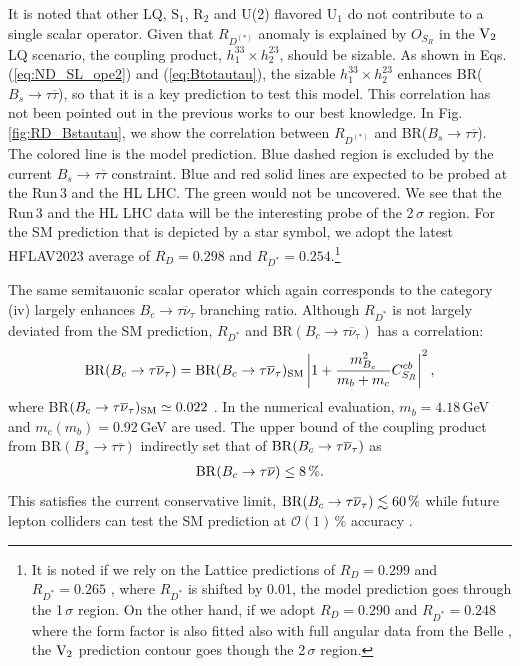 \documentclass[12pt, a4paper]{article}
\numberwithin{equation}{section} %
\newcommand{\ov}{\overline}
\newcommand{\1}{\mbox{1}\hspace{-0.25em}\mbox{l}}
\begin{document}
It is noted that other LQ, $\text{S}_1$, $\text{R}_2$ and U(2) flavored $\text{U}_1$ do not contribute to a single scalar operator.
Given that $R_{D^{(*)}}$ anomaly is explained by $O_{S_R}$ in the $\rm{V}_2$ LQ scenario, the coupling product, $h_1^{33}\times h_2^{23}$, should be sizable. 
As shown in Eqs.\,(\ref{eq:ND_SL_ope2}) and (\ref{eq:Btotautau}), the sizable $h_1^{33}\times h_2^{23}$ enhances BR($B_s\to\tau\ov\tau$), so that it is a key prediction to test this model.
This correlation has not been pointed out in the previous works to our best knowledge.
In Fig.\,\ref{fig:RD_Bstautau}, we show the correlation between $R_{D^{(*)}}$ and BR($B_s\to\tau\ov\tau$).
The colored line is the model prediction.
Blue dashed region is excluded by the current $B_s\to\tau\ov\tau$ constraint.
Blue and red solid lines are expected to be probed at the Run\,3 and the HL LHC.
The green would not be uncovered.
We see that the Run\,3 and the HL LHC data will be the interesting probe of the 2\,$\sigma$ region.
For the SM prediction that is depicted by a star symbol, we adopt the latest HFLAV2023 average of $R_{D}=0.298$ and $R_{D^{*}}=0.254$.\footnote{It is noted if we rely on the Lattice predictions of $R_{D}=0.299$ and $R_{D^{*}}=0.265$ \cite{MILC:2015uhg,FermilabLattice:2021cdg,Fedele:2022iib}, where $R_{D^*}$ is shifted by 0.01, the model prediction goes through the 1\,$\sigma$ region. 
On the other hand, if we adopt $R_{D}=0.290$ and $R_{D^{*}}=0.248$ \cite{Iguro:2020cpg} where the form factor is also fitted also with full angular data from the Belle \cite{Belle:2017rcc,Belle:2018ezy}, the $\rm{V}_2$ prediction contour goes though the 2\,$\sigma$ region.}


The same semitauonic scalar operator which again corresponds to the category (iv) largely enhances $B_c\to\tau\ov\nu_\tau$ branching ratio.
Although $R_{D^*}$ is not largely deviated from the SM prediction, $R_{D^*}$ and BR$(B_c\to\tau\ov\nu_\tau)$ has a correlation:
\begin{align}
 \label{eq:Bc}
{\rm{BR}}(B_c\to \tau\overline\nu_\tau) ={\rm{BR}}(B_c\to \tau\overline\nu_\tau)_{\rm SM}\left| 1 + \frac{m_{B_c}^2}{m_b+m_c}C_{S_R}^{cb} \right|^2 ,    
\end{align}
where BR$(B_c\to \tau\overline\nu_\tau)_{\rm SM} \simeq 0.022$ \cite{Iguro:2022yzr}.
In the numerical evaluation, $m_b=4.18$\,GeV and $m_c(m_b)=0.92$\,GeV are used.
The upper bound of the coupling product from  BR$(B_s\to\tau\ov\tau)$ indirectly set that of ${\rm{BR}} (B_c\to\tau\ov\nu_\tau)$ as
\begin{align}
{\rm{BR}} (B_c\to\tau\ov\nu) \le 8\,\%.
\end{align}
This satisfies the current conservative limit, ${\rm{BR}} (B_c\to\tau\ov\nu_\tau) \lesssim 60\,\%$ \cite{Blanke:2018yud} while future lepton colliders can test the SM prediction at $\mathcal{O}(1)\,\%$ accuracy \cite{Zheng:2020ult,Amhis:2021cfy,Fedele:2023gyi}.
\end{document}
